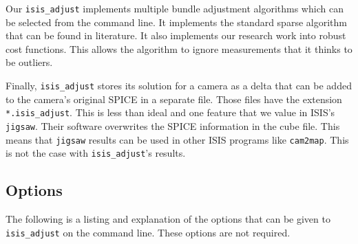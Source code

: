 Our \texttt{isis\_adjust} implements multiple bundle adjustment
algorithms which can be selected from the command line. It implements
the standard sparse algorithm that can be found in literature. It also
implements our research work into robust cost functions. This allows
the algorithm to ignore measurements that it thinks to be outliers.

Finally, \texttt{isis\_adjust} stores its solution for a camera as a
delta that can be added to the camera's original SPICE in a separate
file. Those files have the extension \texttt{*.isis\_adjust}. This is
less than ideal and one feature that we value in \ac{ISIS}'s
\texttt{jigsaw}. Their software overwrites the SPICE information in
the cube file. This means that \texttt{jigsaw} results can be used in
other \ac{ISIS} programs like \texttt{cam2map}. This is not the case
with \texttt{isis\_adjust}'s results.

\subsection{Options}

The following is a listing and explanation of the options that can be
given to \texttt{isis\_adjust} on the command line. These options are
not required.

